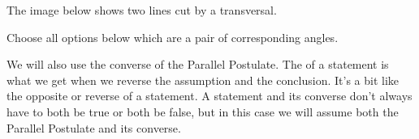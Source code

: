 \documentclass{ximera}
\begin{document}
\begin{question}
The image below shows two lines cut by a transversal.
\begin{center}
\end{center}
Choose all options below which are a pair of corresponding angles.
\begin{selectAll}

\end{selectAll}
\end{question}

We will also use the converse of the Parallel Postulate. The  of a statement is what we get when we reverse the assumption and the conclusion. It's a bit like the opposite or reverse of a statement. A statement and its converse don't always have to both be true or both be false, but in this case we will assume both the Parallel Postulate and its converse.
\end{document}
